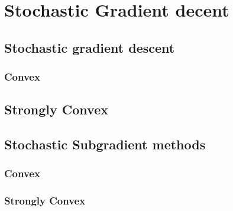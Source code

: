 




\section{Stochastic Gradient decent}



\subsection{Stochastic gradient descent}
\subsubsection{Convex}
\label{sec:convexsmoothsgd}
% 




\subsection{Strongly Convex}


\subsection{Stochastic Subgradient methods}
\subsubsection{Convex}
\label{sec:sgdcvxnonsmth}


\subsubsection{Strongly Convex}
\label{sec:sgdscvxnonsmth}




